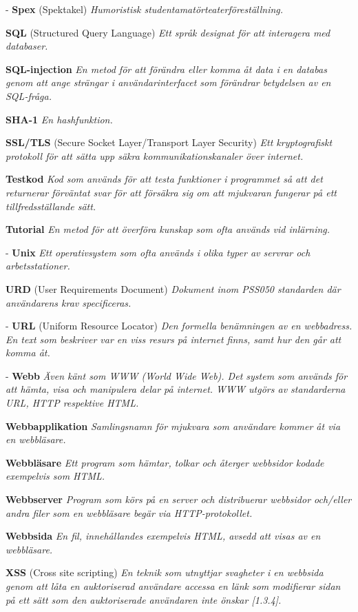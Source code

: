 \documentclass[a4paper, twoside, 11pt, titlepage]{article}
\begin{document}
- \textbf{Spex} (Spektakel) \emph{Humoristisk studentamatörteaterföreställning.}

\textbf{SQL} (Structured Query Language) \emph{Ett språk designat för att interagera med databaser.}

\textbf{SQL-injection} \emph{En metod för att förändra eller komma åt data i en databas genom att ange strängar i användarinterfacet som förändrar betydelsen av en SQL-fråga.}

\textbf{SHA-1} \emph{En hashfunktion.}

\textbf{SSL/TLS} (Secure Socket Layer/Transport Layer Security) \emph{Ett kryptografiskt protokoll för att sätta upp säkra kommunikationskanaler över internet.}

\textbf{Testkod} \emph{Kod som används för att testa funktioner i programmet så att det returnerar förväntat svar för att försäkra sig om att mjukvaran fungerar på ett tillfredsställande sätt.}

\textbf{Tutorial} \emph{En metod för att överföra kunskap som ofta används vid inlärning.}

- \textbf{Unix} \emph{Ett operativsystem som ofta används i olika typer av servrar och arbetsstationer.}

\textbf{URD} (User Requirements Document) \emph{Dokument inom PSS050 standarden där användarens krav specificeras.}

- \textbf{URL} (Uniform Resource Locator) \emph{Den formella benämningen av en webbadress. En text som beskriver var en viss resurs på internet finns, samt hur den går att komma åt.}

- \textbf{Webb} \emph{Även känt som WWW (World Wide Web). Det system som används för att hämta, visa och manipulera delar på internet. WWW utgörs av standarderna URL, HTTP respektive HTML.}

\textbf{Webbapplikation} \emph{Samlingsnamn för mjukvara som användare kommer åt via en webbläsare.}

\textbf{Webbläsare} \emph{Ett program som hämtar, tolkar och återger webbsidor kodade exempelvis som HTML.}

\textbf{Webbserver} \emph{Program som körs på en server och distribuerar webbsidor och/eller andra filer som en webbläsare begär via HTTP-protokollet.}

\textbf{Webbsida} \emph{En fil, innehållandes exempelvis HTML, avsedd att visas av en webbläsare.}

\textbf{XSS} (Cross site scripting) \emph{En teknik som utnyttjar svagheter i en webbsida genom att låta en auktoriserad användare accessa en länk som modifierar sidan på ett sätt som den auktoriserade användaren inte önskar [1.3.4].}
\end{document}
